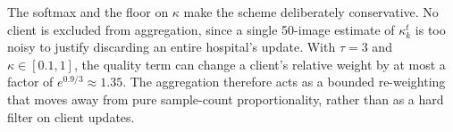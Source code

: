 The softmax and the floor on $\kappa$ make the scheme deliberately
conservative. No client is excluded from aggregation, since a single
50-image estimate of $\kappa_k^t$ is too noisy to justify discarding an
entire hospital's update. With $\tau = 3$ and $\kappa \in [0.1, 1]$, the
quality term can change a client's relative weight by at most a factor of
$e^{0.9/3} \approx 1.35$. The aggregation therefore acts as a bounded
re-weighting that moves away from pure sample-count proportionality, rather
than as a hard filter on client updates.

%
%
%
%
%
